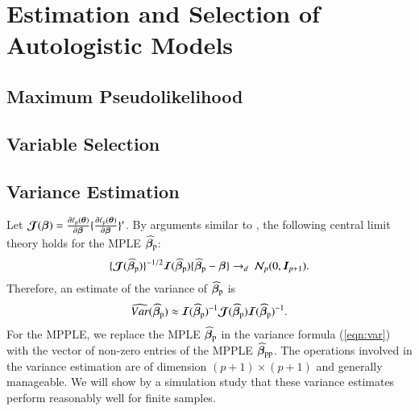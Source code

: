 \documentclass[authoryear,review, 11pt]{elsarticle}
\begin{document}
%
%
\section{Estimation and Selection of Autologistic Models}
\label{sec:infer}

\subsection{Maximum Pseudolikelihood}
\label{subsec:infer:pseudo}


\subsection{Variable Selection}
\label{subsec:infer:varsel}


\subsection{Variance Estimation}
\label{subsec:infer:se}

Let $\bm{\mathcal{J}}(\bm{\beta})=\frac{\partial\ell_{{\rm p}}(\bm{\theta})}{\partial\bm{\beta}}\{\frac{\partial\ell_{{\rm p}}(\bm{\theta})}{\partial\bm{\beta}}\}'$. 
By arguments similar to \cite{banerjeec04}, the following central limit theory holds for the MPLE $\widehat{\bm{\beta}}_{\rm p}$:
\begin{eqnarray}
\{\bm{\mathcal{J}}(\widehat{\bm{\beta}}_{\rm p})\}^{-1/2} \bm{\mathcal{I}}(\widehat{\bm{\beta}}_{\rm p})\{\widehat{\bm{\beta}}_{\rm p}-\bm{\beta}\} \rightarrow_d \ \mathcal{N}_p(0,\bm{I}_{p+1}).
\label{eqn:CLT}
\end{eqnarray}
Therefore, an estimate of the variance of $\bm{\widehat{\beta}}_{\rm p}$ is
\begin{eqnarray}
\widehat{Var}(\widehat{\bm{\beta}}_{\rm p})\approx\bm{\mathcal{I}}(\widehat{\bm{\beta}}_{\rm p})^{-1}\bm{\mathcal{J}}(\widehat{\bm{\beta}}_{\rm p})\bm{\mathcal{I}}(\widehat{\bm{\beta}}_{\rm p})^{-1}.
\label{eqn:var}
\end{eqnarray}  
For the MPPLE, we replace the MPLE $\widehat{\bm{\beta}}_{\rm p}$ in the variance formula (\ref{eqn:var}) with the vector of non-zero entries of the MPPLE $\widehat{\bm{\beta}}_{\rm pp}$. The operations involved in the variance estimation are of dimension $(p+1)\times(p+1)$ and generally manageable. We will show by a simulation study that these variance estimates perform reasonably well for finite samples.  
\end{document}
